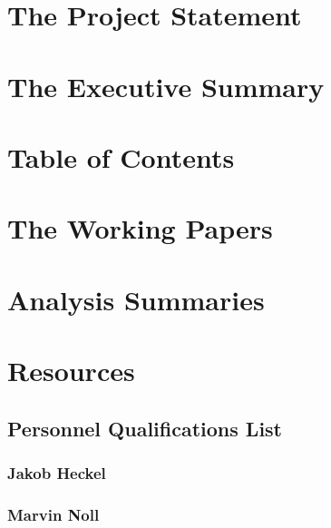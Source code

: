 \documentclass[12pt,a4paper,numbers=noenddot]{scrartcl}
\begin{document}

\setcounter{page}{1}

\section{The Project Statement}

\newpage

\section{The Executive Summary}

\newpage

\section{Table of Contents}
\tableofcontents
\newpage

\section{The Working Papers}
\newcommand{\mydef}[1]{{\footnotesize \textit{#1}}}

\newpage

\newpage

\newpage

\section{Analysis Summaries}

\newpage

\section{Resources}
\subsection{Personnel Qualifications List}
\subsubsection{Jakob Heckel}

\newpage
\subsubsection{Marvin Noll}

\newpage
\end{document}
